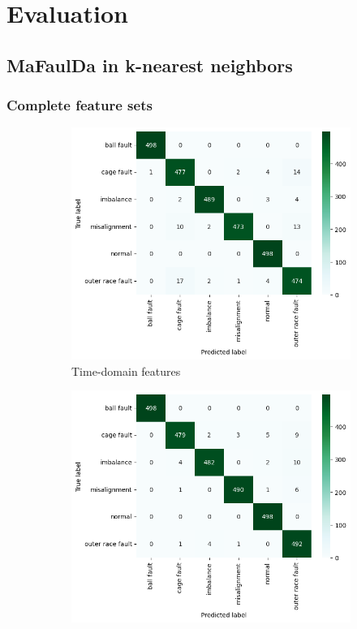 \chapter{Evaluation} \label{section:evaluation} 


\section{MaFaulDa in k-nearest neighbors}

\subsection{Complete feature sets}
\begin{figure}[h]
    \centering
    \begin{subfigure}[b]{0.49\textwidth}
        \includegraphics[width=\textwidth]{assets/results/all-features/TD-confusion-matrix.png}
        \caption{Time-domain features}
    \end{subfigure}
    \hfill
    \begin{subfigure}[b]{0.49\textwidth}
        \includegraphics[width=\textwidth]{assets/results/all-features/FD-confusion-matrix.png}

\end{subfigure}
\end{figure}
